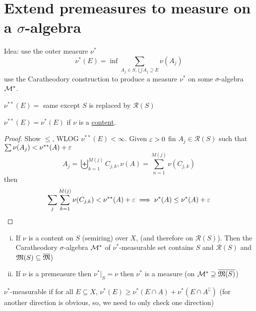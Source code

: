 \section{Extend premeasures to measure on a $\sigma$-algebra}

Idea: use the outer measure $\nu^*$
\[\nu^*(E) = \inf \sum_{A_j \in S, \bigcup A_j \supseteq E} \nu(A_j)\]
use the Caratheodory construction to produce a measure $\nu^*$ on some $\sigma$-algebra $\mathcal M^*$.

$\nu^{**}(E) = $ same except $S$ is replaced by $\mathcal{R}(S)$

\begin{claim}
  $\nu^{**}(E) = \nu^{*}(E)$
  if $\nu$ is a \underline{content}.
\end{claim}

\begin{proof}
  Show $\le$, WLOG $\nu^{**}(E) < \infty$. 
  Given $\varepsilon > 0$ fin $A_j \in \mathcal{R}(S)$ such that $\sum \nu(A_j) < \nu^{**}(A) + \varepsilon$
  \[A_j =\biguplus_{k=1}^{M(j)} C_{j, k}, \nu(A) = \sum_{n=1}^{M(j)} \nu(C_{j, k})\]
  then 
  \[\sum_j\sum_{k=1}^{M(j)} \nu(C_{j, k}) < \nu^{**}(A) + \varepsilon \implies \nu^{*}(A) \le \nu^*(A) + \varepsilon\]
\end{proof}

\begin{theorem} 
  \begin{enumerate}[(i)]
    \item If $\nu$ is a content on $S$ (semiring) over $X$, (and therefore on $\mathcal{R}(S)$).  
      Then the Caratheodory $\sigma$-algebra $\mathcal M^*$ of $\nu^*$-measurable set contains $S$ {and $\mathcal{R}(S)$} and $\mathfrak M(S) \subseteq \overline{\mathfrak M}$)
    \item If $\nu$ is a premeasure then $\nu^*|_{S} = \nu$
    then $\nu^*$ is a measure (on $\mathcal M^* \supseteq \overline{\mathfrak M(S)}$)
  \end{enumerate}
\end{theorem}

$\nu^*$-measurable if for all $E \subseteq X$, $\nu^*(E) \ge \nu^*(E \cap A) + \nu^*(E \cap A^\complement)$
(for another direction is obvious, so, we need to only check one direction)

